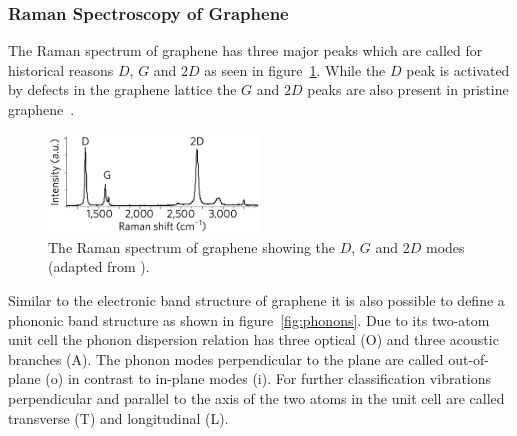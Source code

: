 \subsubsection{Raman Spectroscopy of Graphene}

The Raman spectrum of graphene has three major peaks which are called for historical reasons $D$, $G$ and $2D$ as seen in figure~\ref{fig:dispersion}. While the $D$ peak is activated by defects in the graphene lattice the $G$ and $2D$ peaks are also present in pristine graphene~\cite{Ferrari2013}.

\begin{figure}[!h]
  \centering
  \includegraphics[width=0.5\textwidth]{./images/graphene-raman.png}
  \caption{The Raman spectrum of graphene showing the $D$, $G$ and $2D$ modes (adapted from \cite{Ferrari2013}).}
  \label{fig:dispersion}
\end{figure}

Similar to the electronic band structure of graphene it is also possible to define a phononic band structure as shown in figure~\ref{fig:phonons}. Due to its two-atom unit cell the phonon dispersion relation has three optical (O) and three acoustic branches (A). The phonon modes perpendicular to the plane are called out-of-plane (o) in contrast to in-plane modes (i). For further classification vibrations perpendicular and parallel to the axis of the two atoms in the unit cell are called transverse (T) and longitudinal (L).

